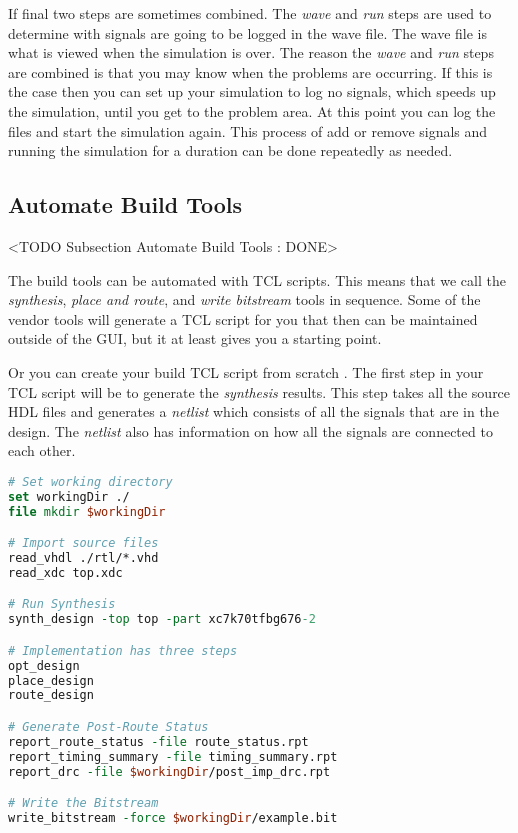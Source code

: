 If final two steps are sometimes combined. The \emph{wave} and \emph{run} steps are used to determine with signals are going to be logged in the wave file. The wave file is what is viewed when the simulation is over. The reason the \emph{wave} and \emph{run} steps are combined is that you may know when the problems are occurring. If this is the case then you can set up your simulation to log no signals, which speeds up the simulation, until you get to the problem area. At this point you can log the files and start the simulation again. This process of add or remove signals and running the simulation for a duration can be done repeatedly as needed. 
	
\subsection{Automate Build Tools}
	<TODO Subsection Automate Build Tools : DONE>

The build tools can be automated with \ac{TCL} scripts. This means that we call the \emph{synthesis}, \emph{place and route}, and \emph{write bitstream} tools in sequence. Some of the vendor tools will generate a \ac{TCL} script for you that then can be maintained outside of the \ac{GUI}, but it at least gives you a starting point. 

Or you can create your build \ac{TCL} script from scratch \cite{xiltclug}. The first step in your \ac{TCL} script will be to generate the \emph{synthesis} results. This step takes all the source \ac{HDL} files and generates a \emph{netlist} which consists of all the signals that are in the design. The \emph{netlist} also has information on how all the signals are connected to each other.

\begin{lstlisting}[language=tcl]
# Set working directory
set workingDir ./
file mkdir $workingDir

# Import source files
read_vhdl ./rtl/*.vhd
read_xdc top.xdc

# Run Synthesis
synth_design -top top -part xc7k70tfbg676-2

# Implementation has three steps
opt_design
place_design
route_design

# Generate Post-Route Status
report_route_status -file route_status.rpt
report_timing_summary -file timing_summary.rpt
report_drc -file $workingDir/post_imp_drc.rpt

# Write the Bitstream
write_bitstream -force $workingDir/example.bit
\end{lstlisting}


